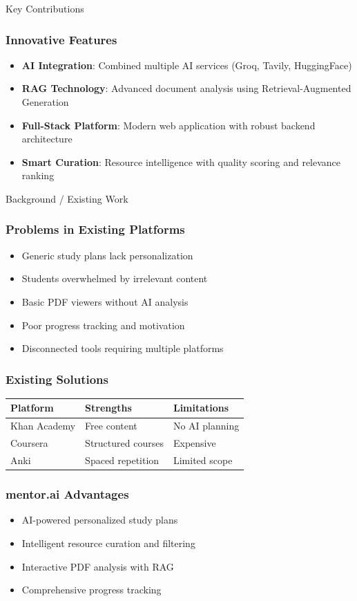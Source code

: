 \documentclass{beamer}
\begin{document}
\begin{frame}{Key Contributions}
\frametitle{Innovative Features}
\begin{itemize}
\item \textbf{AI Integration}: Combined multiple AI services (Groq, Tavily, HuggingFace)
\item \textbf{RAG Technology}: Advanced document analysis using Retrieval-Augmented Generation
\item \textbf{Full-Stack Platform}: Modern web application with robust backend architecture
\item \textbf{Smart Curation}: Resource intelligence with quality scoring and relevance ranking
\end{itemize}
\end{frame}

\begin{frame}{Background / Existing Work}
\frametitle{Problems in Existing Platforms}
\begin{itemize}
\item Generic study plans lack personalization
\item Students overwhelmed by irrelevant content
\item Basic PDF viewers without AI analysis
\item Poor progress tracking and motivation
\item Disconnected tools requiring multiple platforms
\end{itemize}

\vspace{0.3cm}
\frametitle{Existing Solutions}
\begin{tabular}{|p{2.5cm}|p{3cm}|p{2.5cm}|}
\hline
\textbf{Platform} & \textbf{Strengths} & \textbf{Limitations} \\
\hline
Khan Academy & Free content & No AI planning \\
\hline
Coursera & Structured courses & Expensive \\
\hline
Anki & Spaced repetition & Limited scope \\
\hline
\end{tabular}

\vspace{0.3cm}
\frametitle{mentor.ai Advantages}
\begin{itemize}
\item AI-powered personalized study plans
\item Intelligent resource curation and filtering
\item Interactive PDF analysis with RAG
\item Comprehensive progress tracking
\end{itemize}
\end{frame}
\end{document}
